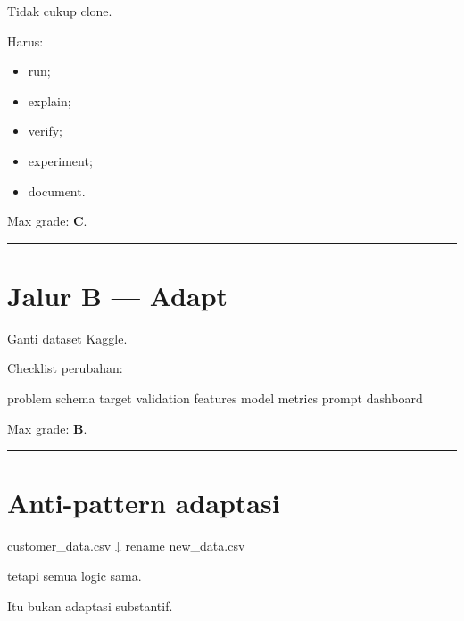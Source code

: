 \documentclass[
  indonesian,
  letterpaper,
  DIV=11,
  numbers=noendperiod]{scrreprt}
\newenvironment{Shaded}{\begin{snugshade}}{\end{snugshade}}
\newcommand{\NormalTok}[1]{\textcolor[rgb]{0.00,0.23,0.31}{#1}}
\providecommand{\tightlist}{%
  \setlength{\itemsep}{0pt}\setlength{\parskip}{0pt}}
\begin{document}
Tidak cukup clone.

Harus:

\begin{itemize}
\tightlist
\item
  run;
\item
  explain;
\item
  verify;
\item
  experiment;
\item
  document.
\end{itemize}

Max grade: \textbf{C}.

\begin{center}\rule{0.5\linewidth}{0.5pt}\end{center}

\section{Jalur B --- Adapt}\label{jalur-b-adapt-1}

Ganti dataset Kaggle.

Checklist perubahan:

\begin{Shaded}
\begin{Highlighting}[]
\NormalTok{problem}
\NormalTok{schema}
\NormalTok{target}
\NormalTok{validation}
\NormalTok{features}
\NormalTok{model}
\NormalTok{metrics}
\NormalTok{prompt}
\NormalTok{dashboard}
\end{Highlighting}
\end{Shaded}

Max grade: \textbf{B}.

\begin{center}\rule{0.5\linewidth}{0.5pt}\end{center}

\section{Anti-pattern adaptasi}\label{anti-pattern-adaptasi}

\begin{Shaded}
\begin{Highlighting}[]
\NormalTok{customer\_data.csv}
\NormalTok{↓ rename}
\NormalTok{new\_data.csv}
\end{Highlighting}
\end{Shaded}

tetapi semua logic sama.

Itu bukan adaptasi substantif.
\end{document}
